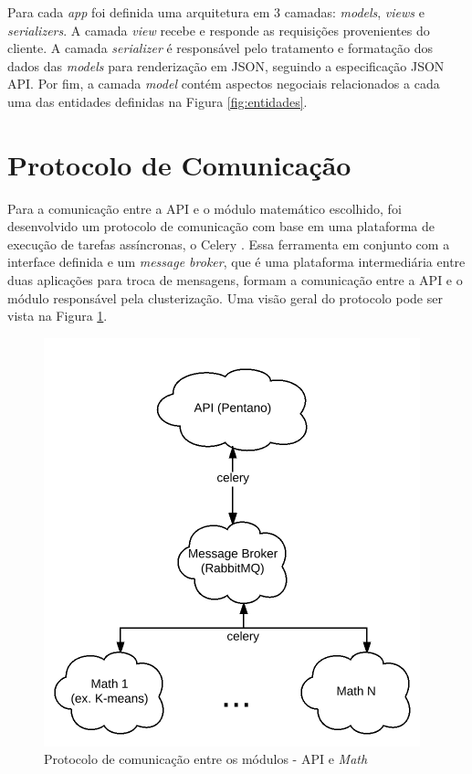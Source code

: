 Para cada \textit{app} foi definida uma arquitetura
em 3 camadas: \textit{models}, \textit{views} e \textit{serializers}.
A camada \textit{view} recebe e responde as requisições provenientes do cliente.
A camada \textit{serializer} é responsável pelo tratamento e formatação dos dados das \textit{models}
para renderização em JSON, seguindo a especificação JSON API.
Por fim, a camada \textit{model} contém aspectos negociais relacionados a cada uma das entidades definidas na 
Figura \ref{fig:entidades}. 

\section{Protocolo de Comunicação}

Para a comunicação entre a API e o módulo matemático escolhido, foi desenvolvido um protocolo de comunicação com base
em uma plataforma de execução de tarefas assíncronas, o Celery \footnotemark. 
Essa ferramenta em conjunto com a interface definida e um \textit{message broker}, que é uma plataforma intermediária
entre duas aplicações para troca de mensagens, formam a comunicação entre a API e o módulo responsável pela clusterização. 
Uma visão geral do protocolo pode ser vista na 
Figura \ref{fig:protocolo}.

\begin{figure}[bt!]
\centering
\includegraphics[scale=0.6]{figuras/protocolo.png}
\caption{Protocolo de comunicação entre os módulos - API e \textit{Math}}
\label{fig:protocolo}
\end{figure}

